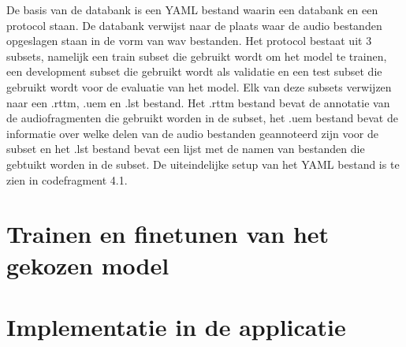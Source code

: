 De basis van de databank is een YAML bestand waarin een databank en een protocol staan. De databank verwijst naar de plaats waar de audio bestanden opgeslagen staan in de vorm van wav bestanden. Het protocol bestaat uit 3 subsets, namelijk een train subset die gebruikt wordt om het model te trainen, een development subset die gebruikt wordt als validatie en een test subset die gebruikt wordt voor de evaluatie van het model. Elk van deze subsets verwijzen naar een .rttm, .uem en .lst bestand. Het .rttm bestand bevat de annotatie van de audiofragmenten die gebruikt worden in de subset, het .uem bestand bevat de informatie over welke delen van de audio bestanden geannoteerd zijn voor de subset en het .lst bestand bevat een lijst met de namen van bestanden die gebtuikt worden in de subset. De uiteindelijke setup van het YAML bestand is te zien in codefragment 4.1.



\section{Trainen en finetunen van het gekozen model}
\label{sec:trainen}


\section{Implementatie in de applicatie}
\label{sec:implementatie}
